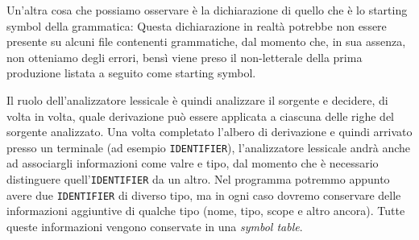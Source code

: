 \documentclass[class=book, crop=false, oneside, 12pt]{standalone}
\begin{document}



Un'altra cosa che possiamo osservare è la dichiarazione di quello che è lo starting symbol della grammatica:
Questa dichiarazione in realtà potrebbe non essere presente su alcuni file contenenti grammatiche, dal momento che, in sua assenza, non otteniamo degli errori, bensì viene preso il non-letterale della prima produzione listata a seguito come starting symbol.


Il ruolo dell’analizzatore lessicale è quindi analizzare il sorgente e decidere, di volta in volta, quale derivazione può essere applicata a ciascuna delle righe del sorgente analizzato. Una volta completato l'albero di derivazione e quindi arrivato presso un terminale (ad esempio \texttt{IDENTIFIER}), l'analizzatore lessicale andrà anche ad associargli informazioni come valre e tipo, dal momento che è necessario distinguere quell'\texttt{IDENTIFIER} da un altro. Nel programma potremmo appunto avere due \texttt{IDENTIFIER} di diverso tipo, ma in ogni caso dovremo conservare delle informazioni aggiuntive di qualche tipo (nome, tipo, scope e altro ancora). Tutte queste informazioni vengono conservate in una \emph{symbol table}.
\end{document}
